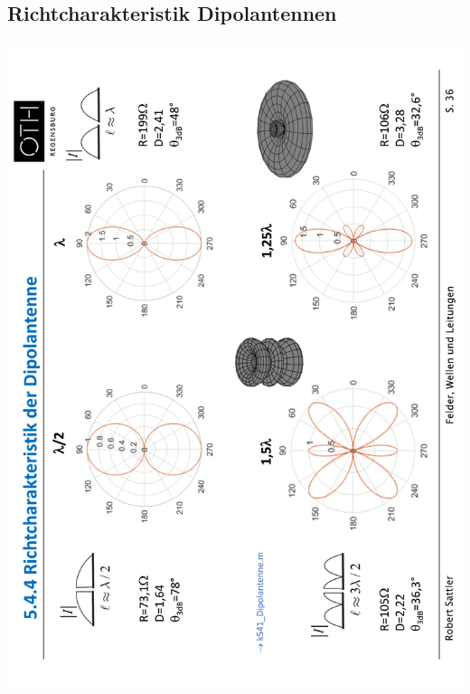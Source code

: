 \subsection{Richtcharakteristik Dipolantennen}
\includegraphics[angle=-90, width=0.93\linewidth]{Figures/Dipolantenne_Richtcharakteristik.pdf}
